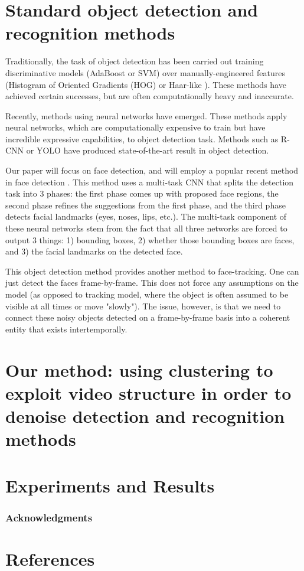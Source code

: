 \documentclass{article}
\begin{document}
\section{Standard object detection and recognition methods}

Traditionally, the task of object detection has been carried out training
discriminative models (AdaBoost or SVM) over manually-engineered features (Histogram of Oriented Gradients (HOG) \cite{hog}
or Haar-like \cite{haar}). These methods have achieved certain successes, but
are often computationally heavy and inaccurate.

Recently, methods using neural networks have emerged. These methods apply neural
networks, which are computationally expensive to train but have incredible
expressive capabilities, to object detection task. Methods such as
R-CNN \cite{rcnn} or YOLO \cite{yolo} have produced state-of-the-art result
in object detection.

Our paper will focus on face detection, and will employ a popular recent
method in face detection \cite{mtcnn}. This method uses a multi-task CNN
that splits the detection task into 3 phases: the first phase comes up with
proposed face regions, the second phase refines the suggestions from the
first phase, and the third phase detects facial landmarks (eyes, noses, lips, etc.).
The multi-task component of these neural networks stem from the fact that
all three networks are forced to output 3 things: 1) bounding boxes, 2) whether
those bounding boxes are faces, and 3) the facial landmarks on the detected
face.

This object detection method provides another method to face-tracking. One can
just detect the faces frame-by-frame. This does not force any assumptions on
the model (as opposed to tracking model, where the object is often assumed to
be visible at all times or move "slowly"). The issue, however, is that we
need to connect these noisy objects detected on a frame-by-frame basis into
a coherent entity that exists intertemporally.

\section{Our method: using clustering to exploit video structure in order to denoise detection and recognition methods}


\section{Experiments and Results}

\subsubsection*{Acknowledgments}

\section*{References}



\end{document}
